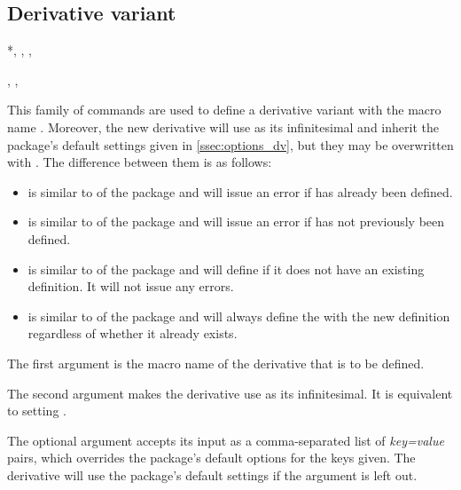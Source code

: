 	\subsection{Derivative variant} \label{ssec:defvar_dv}
	
	\begin{function}*{\NewDerivative, \RenewDerivative, \ProvideDerivative, \DeclareDerivative}
		\begin{syntax}
			, , 
		\end{syntax}
		This family of commands are used to define a derivative variant with the macro name . Moreover, the new derivative will use  as its infinitesimal and inherit the package's default settings given in \cref{ssec:options_dv}, but they may be overwritten with . The difference between them is as follows:
		\begin{itemize}
			\item {} is similar to  of the  package and will issue an error if  has already been defined.
			\item {} is similar to  of the  package and will issue an error if  has not previously been defined.
			\item {} is similar to  of the  package and will define  if it does not have an existing definition. It will not issue any errors.
			\item {} is similar to  of the  package and will always define the  with the new definition regardless of whether it already exists.
		\end{itemize}
		
		\begin{argument}{1}
			The first argument is the macro name of the derivative that is to be defined.
		\end{argument}
		
		\begin{argument}{2}
			The second argument makes the derivative  use  as its infinitesimal. It is equivalent to setting .
		\end{argument}
		
		\begin{argument}{3}
			The optional argument accepts its input as a comma-separated list of \emph{key=value} pairs, which overrides the package's default options for the keys given. The derivative  will use the package's default settings if the argument is left out.
		\end{argument}
	\end{function}
	
